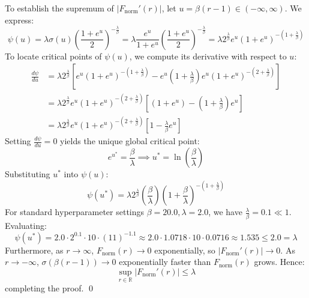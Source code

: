 \documentclass[11pt, a4paper]{article}
\begin{document}
To establish the supremum of $|F_{\text{norm}}'(r)|$, let $u = \beta(r - 1) \in (-\infty, \infty)$. We express:
\begin{equation}
    \psi(u) = \lambda \sigma(u) \left(\frac{1 + e^u}{2}\right)^{-\frac{\lambda}{\beta}} = \lambda \frac{e^u}{1 + e^u} \left(\frac{1 + e^u}{2}\right)^{-\frac{\lambda}{\beta}} = \lambda 2^{\frac{\lambda}{\beta}} e^u (1 + e^u)^{-\left(1 + \frac{\lambda}{\beta}\right)}
\end{equation}
To locate critical points of $\psi(u)$, we compute its derivative with respect to $u$:
\begin{align}
    \frac{d\psi}{du} &= \lambda 2^{\frac{\lambda}{\beta}} \left[ e^u (1 + e^u)^{-\left(1 + \frac{\lambda}{\beta}\right)} - e^u \left(1 + \frac{\lambda}{\beta}\right) e^u (1 + e^u)^{-\left(2 + \frac{\lambda}{\beta}\right)} \right] \\
    &= \lambda 2^{\frac{\lambda}{\beta}} e^u (1 + e^u)^{-\left(2 + \frac{\lambda}{\beta}\right)} \left[ (1 + e^u) - \left(1 + \frac{\lambda}{\beta}\right) e^u \right] \\
    &= \lambda 2^{\frac{\lambda}{\beta}} e^u (1 + e^u)^{-\left(2 + \frac{\lambda}{\beta}\right)} \left[ 1 - \frac{\lambda}{\beta} e^u \right]
\end{align}
Setting $\frac{d\psi}{du} = 0$ yields the unique global critical point:
\begin{equation}
    e^{u^*} = \frac{\beta}{\lambda} \implies u^* = \ln\left(\frac{\beta}{\lambda}\right)
\end{equation}
Substituting $u^*$ into $\psi(u)$:
\begin{equation}
    \psi(u^*) = \lambda 2^{\frac{\lambda}{\beta}} \left(\frac{\beta}{\lambda}\right) \left(1 + \frac{\beta}{\lambda}\right)^{-\left(1 + \frac{\lambda}{\beta}\right)}
\end{equation}
For standard hyperparameter settings $\beta = 20.0, \lambda = 2.0$, we have $\frac{\lambda}{\beta} = 0.1 \ll 1$. Evaluating:
\begin{equation}
    \psi(u^*) = 2.0 \cdot 2^{0.1} \cdot 10 \cdot (11)^{-1.1} \approx 2.0 \cdot 1.0718 \cdot 10 \cdot 0.0716 \approx 1.535 \le 2.0 = \lambda
\end{equation}
Furthermore, as $r \to \infty$, $F_{\text{norm}}(r) \to 0$ exponentially, so $|F_{\text{norm}}'(r)| \to 0$. As $r \to -\infty$, $\sigma(\beta(r - 1)) \to 0$ exponentially faster than $F_{\text{norm}}(r)$ grows. Hence:
\begin{equation}
    \sup_{r \in \mathbb{R}} |F_{\text{norm}}'(r)| \le \lambda
\end{equation}
completing the proof. \qed
\end{document}
